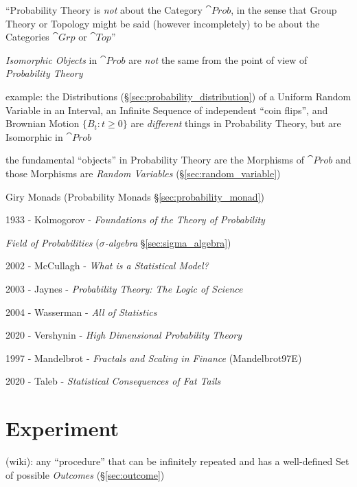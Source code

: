 ``Probability Theory is \emph{not} about the Category $\cat{Prob}$, in the sense
that Group Theory or Topology might be said (however incompletely) to be about
the Categories $\cat{Grp}$ or $\cat{Top}$''

\emph{Isomorphic Objects} in $\cat{Prob}$ are \emph{not} the same from the point
of view of \emph{Probability Theory}

example: the Distributions (\S\ref{sec:probability_distribution}) of a Uniform
Random Variable in an Interval, an Infinite Sequence of independent ``coin
flips'', and Brownian Motion $\{B_t : t \geq 0\}$ are \emph{different} things in
Probability Theory, but are Isomorphic in $\cat{Prob}$

the fundamental ``objects'' in Probability Theory are the Morphisms of
$\cat{Prob}$ and those Morphisms are \emph{Random Variables}
(\S\ref{sec:random_variable})

\fist Giry Monads (Probability Monads \S\ref{sec:probability_monad})

\asterism

1933 - Kolmogorov - \emph{Foundations of the Theory of Probability}

\emph{Field of Probabilities} (\emph{$\sigma$-algebra}
\S\ref{sec:sigma_algebra})

\asterism

2002 - McCullagh - \emph{What is a Statistical Model?}

2003 - Jaynes - \emph{Probability Theory: The Logic of Science}

2004 - Wasserman - \emph{All of Statistics}

2020 - Vershynin - \emph{High Dimensional Probability Theory}

\asterism

1997 - Mandelbrot - \emph{Fractals and Scaling in Finance} (Mandelbrot97E)

2020 - Taleb - \emph{Statistical Consequences of Fat Tails}



\section{Experiment}\label{sec:experiment}

(wiki): any ``procedure'' that can be infinitely repeated and has a well-defined
Set of possible \emph{Outcomes} (\S\ref{sec:outcome})

